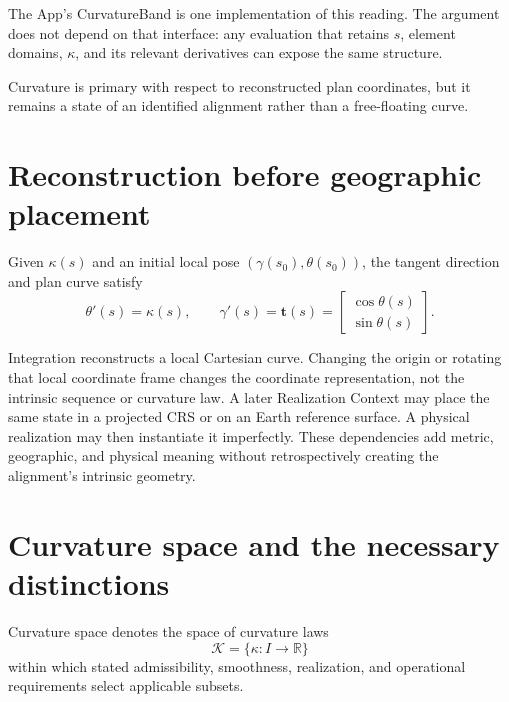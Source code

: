 The App's CurvatureBand is one implementation of this reading. The argument
does not depend on that interface: any evaluation that retains $s$, element
domains, $\kappa$, and its relevant derivatives can expose the same structure.

\begin{principle}
\label{princ:curvature-first}
Curvature is primary with respect to reconstructed plan coordinates, but it
remains a state of an identified alignment rather than a free-floating curve.
\end{principle}

\section{Reconstruction before geographic placement}

\begin{definition}
\label{def:intrinsic-curvature-reconstruction}
Given $\kappa(s)$ and an initial local pose
$(\gamma(s_0),\theta(s_0))$, the tangent direction and plan curve satisfy
\[
\theta'(s)=\kappa(s),\qquad
\gamma'(s)=\mathbf t(s)=
\begin{bmatrix}\cos\theta(s)\\\sin\theta(s)\end{bmatrix}.
\]
\end{definition}

Integration reconstructs a local Cartesian curve. Changing the origin or
rotating that local coordinate frame changes the coordinate representation,
not the intrinsic sequence or curvature law. A later Realization Context may
place the same state in a projected CRS or on an Earth reference surface. A
physical realization may then instantiate it imperfectly. These dependencies
add metric, geographic, and physical meaning without retrospectively creating
the alignment's intrinsic geometry.

\section{Curvature space and the necessary distinctions}

\begin{definition}
\label{def:curvature-space}
Curvature space denotes the space of curvature laws
\[
\mathcal K=\{\kappa:I\to\mathbb R\}
\]
within which stated admissibility, smoothness, realization, and operational
requirements select applicable subsets.
\end{definition}

